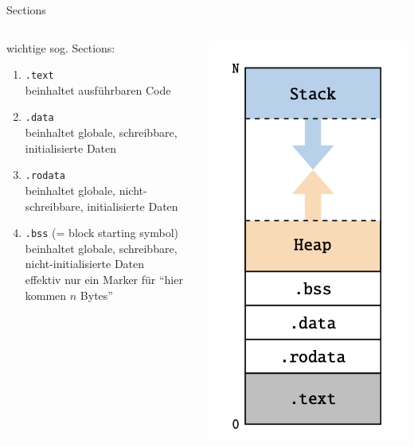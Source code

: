 \documentclass[
  german,            %
  aspectratio=169,    %
]{tumbeamer}
\begin{document}
\begin{frame}[c]{Sections}{}
  \begin{columns}[c]
		\begin{column}{.65\textwidth}
			wichtige sog. Sections:
			\begin{enumerate}
				\item \texttt{.text}\\
				beinhaltet ausführbaren Code
				\item \texttt{.data}\\
				beinhaltet globale, schreibbare, initialisierte Daten
				\item \texttt{.rodata}\\
				beinhaltet globale, nicht-schreibbare, initialisierte Daten
				\item \texttt{.bss} (= block starting symbol)\\
				beinhaltet globale, schreibbare, nicht-initialisierte Daten\\
				effektiv nur ein Marker für \enquote{hier kommen \(n\) Bytes}
			\end{enumerate}
		\end{column}
		\begin{column}{.3\textwidth}
			\vspace*{-2em}
			\centering
      \includegraphics[width=0.8\linewidth]{sections.png}

\end{column}
\end{columns}
\end{frame}
\end{document}
